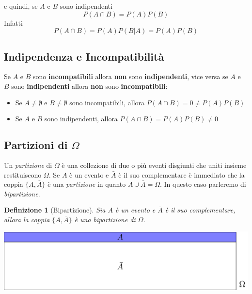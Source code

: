 \documentclass[
  11pt,
]{book}
\providecommand{\tightlist}{%
  \setlength{\itemsep}{0pt}\setlength{\parskip}{0pt}}
\theoremstyle{mytheoremstyle}
\theoremstyle{mydefstyle}
\newtheorem{definition}{Definizione}[section]
\newenvironment{att}
  {
\begin{tcolorbox}[enhanced,arc=0.1mm,boxrule=1pt,colback=white,colframe=ared,title=\bf\small \fontfamily{lmss}\selectfont \faExclamationTriangle \hspace{.5 cm} Attenzione,drop fuzzy shadow]
}{
\end{tcolorbox}
  }
\begin{document}
e quindi, se \(A\) e \(B\) sono indipendenti
\[
P(A\cap B)=P(A)P(B)
\]
Infatti
\[
P(A\cap B)=P(A)P(B|A)=P(A)P(B)
\]

\subsection{Indipendenza e Incompatibilità}\label{indipendenza-e-incompatibilituxe0}

Se \(A\) e \(B\) sono \textbf{incompatibili} allora \textbf{non} sono
\textbf{indipendenti}, vice versa se \(A\) e \(B\) sono \textbf{indipendenti} allora
\textbf{non} sono \textbf{incompatibili}:

\begin{att}

\begin{itemize}
\tightlist
\item
  Se \(A\ne \emptyset\) e \(B\ne \emptyset\) sono incompatibili, allora
  \(P(A\cap B)=0\ne P(A)P(B)\)
\item
  Se \(A\) e \(B\) sono indipendenti, allora \(P(A\cap B)=P(A)P(B)\ne 0\)
\end{itemize}

\end{att}

\subsection{\texorpdfstring{Partizioni di \(\Omega\)}{Partizioni di \textbackslash Omega}}\label{partizioni-di-omega}

Un \emph{partizione} di \(\Omega\) è una collezione di due o più eventi
disgiunti che uniti insieme restituiscono \(\Omega\). Se \(A\) è un evento e
\(\bar A\) è il suo complementare è immediato che la coppia \(\{A,\bar A\}\)
è una \emph{partizione} in quanto \(A\cup\bar A=\Omega\). In questo caso
parleremo di \emph{bipartizione}.

\begin{definition}[Bipartizione]
Sia \(A\) è un evento e \(\bar A\) è il suo complementare, allora la coppia
\(\{A,\bar A\}\) è una \emph{bipartizione} di \(\Omega\).
\end{definition}

\begin{center}\includegraphics[width=41.67in,height=0.2\textheight,]{img/bipartizione} \end{center}
\end{document}
